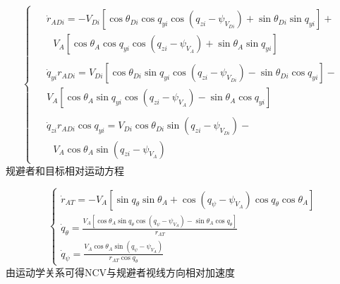 \begin{equation}
\label{eq:1}
\left\{ {\begin{array}{*{20}{l}}
  \begin{aligned}
& {{\dot r}_{ADi}} =  - {V_{Di}}\left[ {\cos {\theta _{Di}}\cos {q_{yi}}\cos \left( {{q_{zi}} - {\psi _{{V_{Di}}}}} \right) + \sin {\theta _{Di}}\sin {q_{yi}}} \right] +  \\
& {\text{   }}{V_A}\left[ {\cos {\theta _A}\cos {q_{yi}}\cos \left( {{q_{zi}} - {\psi _{{V_A}}}} \right) + \sin {\theta _A}\sin {q_{yi}}} \right]
\end{aligned} \\
  \begin{aligned}
& {{\dot q}_{yi}}{r_{ADi}} = {V_{Di}}\left[ {\cos {\theta _{Di}}\sin {q_{yi}}\cos \left( {{q_{zi}} - {\psi _{{V_{Di}}}}} \right) - \sin {\theta _{Di}}\cos {q_{yi}}} \right] -  \\
& {V_A}\left[ {\cos {\theta _A}\sin {q_{yi}}\cos \left( {{q_{zi}} - {\psi _{{V_A}}}} \right) - \sin {\theta _A}\cos {q_{yi}}} \right]
\end{aligned} \\
  \begin{aligned}
& {{\dot q}_{zi}}{r_{ADi}}\cos {q_{yi}} = {V_{Di}}\cos {\theta _{Di}}\sin \left( {{q_{zi}} - {\psi _{{V_{Di}}}}} \right) -  \\
& {\text{           }}{V_A}\cos {\theta _A}\sin \left( {{q_{zi}} - {\psi _{{V_A}}}} \right)
\end{aligned}
\end{array}} \right.
\end{equation}
规避者和目标相对运动方程

\begin{equation}
\label{eq:2}
\left\{ {\begin{array}{*{20}{l}}
  {{{\dot r}_{AT}} =  - {V_A}\left[ {\sin {q_\theta }\sin {\theta _A} + \cos \left( {{q_\psi } - {\psi _{{V_A}}}} \right)\cos {q_\theta }\cos {\theta _A}} \right]} \\ 
  {{{\dot q}_\theta } = \frac{{{V_A}\left[ {\cos {\theta _A}\sin {q_\theta }\cos \left( {{q_\psi } - {\psi _{{V_A}}}} \right) - \sin {\theta _A}\cos {q_\theta }} \right]}}{{{r_{AT}}}}} \\ 
  {{{\dot q}_\psi } = \frac{{{V_A}\cos {\theta _A}\sin \left( {{q_\psi } - {\psi _{{V_A}}}} \right)}}{{{r_{AT}}\cos {q_\theta }}}} 
\end{array}} \right.
\end{equation}
由运动学关系可得NCV与规避者视线方向相对加速度

